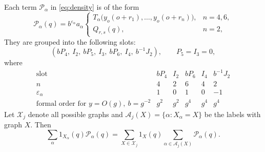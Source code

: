 \documentclass[11pt]{article}
\numberwithin{equation}{section}
\theoremstyle{definition}
\theoremstyle{plain}
\begin{document}
Each term $\mathcal P_\alpha$ in \eqref{eq:density} is of the form
\begin{equation}
 \mathcal P_\alpha(q)=b^{\varepsilon_\alpha}a_\alpha
 \begin{cases}
 T_\alpha\bigl(y_o(o+r_1),\ldots,y_o(o+r_n)\bigr),&n=4,6,\\
 Q_{r,s}(q),&n=2,
 \end{cases}
 \label{eq:canonical-label}
\end{equation}
They are grouped into the following slots:
\begin{equation}
 (bP_4,\ I_2,\ bP_5,\ I_3,\ bP_6,\ I_4,\ b^{-1}J_2),
 \qquad P_5=I_3=0,
 \label{eq:canonical-slots}
\end{equation}
where
\begin{equation}
 \begin{array}{c|ccccc}
 \text{slot}&bP_4&I_2&bP_6&I_4&b^{-1}J_2\\ \hline
 n&4&2&6&4&2\\
 \varepsilon_\alpha&1&0&1&0&-1\\
 \text{formal order for }y=O(g),\ b=g^{-2}
   &g^2&g^2&g^4&g^4&g^4
 \end{array}
\end{equation}
%
Let $\mathcal X_j$ denote all possible graphs and $\mathcal A_j(X)=\{\alpha:X_\alpha=X\}$ be the labels with graph $X$.  Then 
\begin{equation}
 \sum_\alpha1_{X_\alpha}(q)\mathcal P_\alpha(q)
 =\sum_{X\in\mathcal X_j}1_X(q)
      \sum_{\alpha\in\mathcal A_j(X)}\mathcal P_\alpha(q).
 \label{eq:canonical-graph-sum}
\end{equation}
\end{document}
